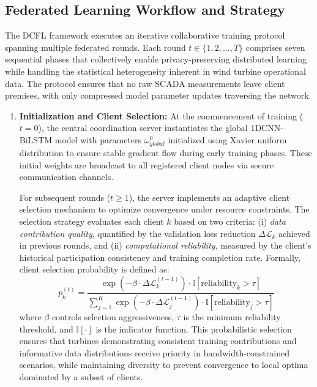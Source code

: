\documentclass[12pt]{article}
\begin{document}
\subsection{Federated Learning Workflow and Strategy}
\label{subsec:fl_workflow}
The DCFL framework executes an iterative collaborative training protocol spanning multiple federated rounds. Each round $t \in \{1, 2, \ldots, T\}$ comprises seven sequential phases that collectively enable privacy-preserving distributed learning while handling the statistical heterogeneity inherent in wind turbine operational data. The protocol ensures that no raw SCADA measurements leave client premises, with only compressed model parameter updates traversing the network.

\begin{enumerate}
    \item \textbf{Initialization and Client Selection:} 
    At the commencement of training ($t=0$), the central coordination server instantiates the global 1DCNN-BiLSTM model with parameters $\omega_{global}^{0}$ initialized using Xavier uniform distribution to ensure stable gradient flow during early training phases. These initial weights are broadcast to all registered client nodes via secure communication channels.
    
    For subsequent rounds ($t \geq 1$), the server implements an adaptive client selection mechanism to optimize convergence under resource constraints. The selection strategy evaluates each client $k$ based on two criteria: (i) \textit{data contribution quality}, quantified by the validation loss reduction $\Delta \mathcal{L}_k$ achieved in previous rounds, and (ii) \textit{computational reliability}, measured by the client's historical participation consistency and training completion rate. Formally, client selection probability is defined as:
    \begin{equation}
    p_k^{(t)} = \frac{\exp(-\beta \cdot \Delta \mathcal{L}_k^{(t-1)}) \cdot \mathbb{I}[\text{reliability}_k > \tau]}{\sum_{j=1}^{K} \exp(-\beta \cdot \Delta \mathcal{L}_j^{(t-1)}) \cdot \mathbb{I}[\text{reliability}_j > \tau]}
    \label{eq:client_selection}
    \end{equation}
    where $\beta$ controls selection aggressiveness, $\tau$ is the minimum reliability threshold, and $\mathbb{I}[\cdot]$ is the indicator function. This probabilistic selection ensures that turbines demonstrating consistent training contributions and informative data distributions receive priority in bandwidth-constrained scenarios, while maintaining diversity to prevent convergence to local optima dominated by a subset of clients.
    

\end{enumerate}
\end{document}
